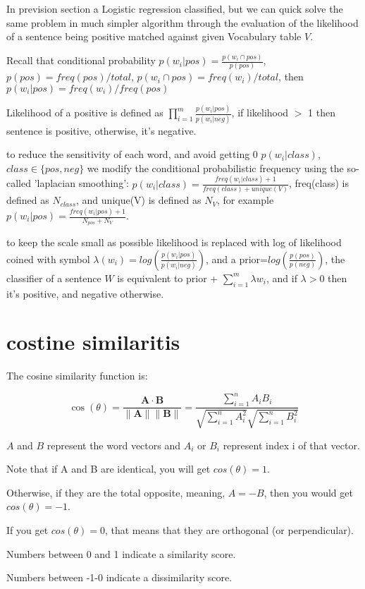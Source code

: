 \documentclass[4apaper,12pt]{book}
\begin{document}
\begin{description}
\item In prevision section a Logistic regression classified, but we can quick solve the same problem in much simpler algorithm through the evaluation of the likelihood of a sentence being positive matched against given Vocabulary table $V$.
\item Recall that conditional probability $p(w_i|pos) = \frac{p(w_i\cap{pos})}{p(pos)}$, $p(pos)=freq(pos)/total$, $p(w_i\cap{pos})=freq(w_i)/total$, then $p(w_i|pos)=freq(w_i)/freq(pos)$
\item Likelihood of a positive is defined as $\prod_{i=1}^{m}{\frac{p(w_i|pos)}{p(w_i|neg)}}$, if likelihood $>$ 1 then sentence is positive, otherwise, it's negative.
\item to reduce the sensitivity of each word, and avoid getting 0 $p(w_i|class)$, $class\in \{pos, neg\}$ we modify the conditional probabilistic frequency using the so-called 'laplacian smoothing': $p(w_i|class)=\frac{freq(w_i|class)+1}{freq(class)+unique(V)}$, freq(class) is defined as $N_{class}$, and unique(V) is defined as $N_V$, for example $p(w_i|pos)=\frac{freq(w_i|pos)+1}{N_{pos}+N_V}$.
\item to keep the scale small as possible likelihood is replaced with log of likelihood coined with symbol $\lambda(w_i)=log(\frac{p(w_i|pos)}{p(w_i|neg)})$, and a prior=$log(\frac{p(pos)}{p(neg)})$, the classifier of a sentence $W$ is equivalent to prior + $\sum_{i=1}^{m}{\lambda{w_i}}$, and if $\lambda>0$ then it's positive, and negative otherwise.
\end{description}
\section {costine similaritis}
\begin{description}

\item The cosine similarity function is:

\item $$\cos (\theta)=\frac{\mathbf{A} \cdot \mathbf{B}}{\|\mathbf{A}\|\|\mathbf{B}\|}=\frac{\sum_{i=1}^{n} A_{i} B_{i}}{\sqrt{\sum_{i=1}^{n} A_{i}^{2}} \sqrt{\sum_{i=1}^{n} B_{i}^{2}}}$$

\item $A$ and $B$ represent the word vectors and $A_i$ or $B_i$ represent index i of that vector.
\item Note that if A and B are identical, you will get $cos(\theta) = 1$.
\item Otherwise, if they are the total opposite, meaning, $A= -B$, then you would get $cos(\theta) = -1$.
\item If you get $cos(\theta) =0$, that means that they are orthogonal (or perpendicular).
\item Numbers between 0 and 1 indicate a similarity score.
\item Numbers between -1-0 indicate a dissimilarity score.
\end{description}
\end{document}

